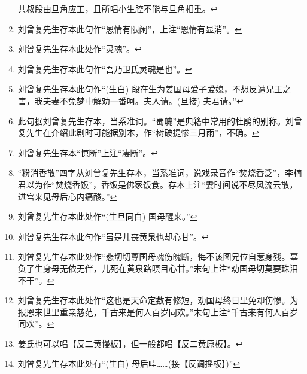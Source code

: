 \begin{enumerate}
  共叔段由旦角应工，且所唱小生腔不能与旦角相重。\protect\hyperlink{fnref14}{↩}
\item
  \leavevmode\hypertarget{fn15}{}%
  刘曾复先生存本此句作``恩情有限闲''，上注``恩情有显消''。\protect\hyperlink{fnref15}{↩}
\item
  \leavevmode\hypertarget{fn16}{}%
  刘曾复先生存本此处作``灵魂''。\protect\hyperlink{fnref16}{↩}
\item
  \leavevmode\hypertarget{fn17}{}%
  刘曾复先生存本此句作``吾乃卫氏灵魂是也''。\protect\hyperlink{fnref17}{↩}
\item
  \leavevmode\hypertarget{fn18}{}%
  刘曾复先生存本此句作``(生白)
  段在生为姜国母爱子爱媳，不想反遭兄王之害，我夫妻不免梦中解劝一番呵。夫人请。(旦接)
  夫君请。''\protect\hyperlink{fnref18}{↩}
\item
  \leavevmode\hypertarget{fn19}{}%
  此句据刘曾复先生存本，当系准词。``蜀魄''是典籍中常用的杜鹃的别称。刘曾复先生在介绍此剧时可能据别本，作``树破提惨三月雨''，不确。\protect\hyperlink{fnref19}{↩}
\item
  \leavevmode\hypertarget{fn20}{}%
  刘曾复先生存本``惊断''上注``凄断''。\protect\hyperlink{fnref20}{↩}
\item
  \leavevmode\hypertarget{fn21}{}%
  ``粉消香散''四字从刘曾复先生存本，当系准词，说戏录音作``焚烧香泛''，李楠君以为作``焚烧香饭''，香饭是佛家饭食。存本上注``霎时间说不尽风流云散，进宫来见母后心内痛酸。''\protect\hyperlink{fnref21}{↩}
\item
  \leavevmode\hypertarget{fn22}{}%
  刘曾复先生存本此处作``(生旦同白)
  国母醒来。''\protect\hyperlink{fnref22}{↩}
\item
  \leavevmode\hypertarget{fn23}{}%
  刘曾复先生存本此句作``虽是儿丧黄泉也却心甘''。\protect\hyperlink{fnref23}{↩}
\item
  \leavevmode\hypertarget{fn24}{}%
  刘曾复先生存本此处作``悲切切尊国母魂伤魄断，悔不该图兄位自惹身残。辜负了生身母无依无伴，儿死在黄泉路瞑目心甘。''末句上注``劝国母切莫要珠泪不干''。\protect\hyperlink{fnref24}{↩}
\item
  \leavevmode\hypertarget{fn25}{}%
  刘曾复先生存本此处作``这也是天命定数有修短，劝国母终日里免却伤惨。为报恩来世里重亲慈范，千古来是何人百岁同欢。''末句上注``千古来有何人百岁同欢''。\protect\hyperlink{fnref25}{↩}
\item
  \leavevmode\hypertarget{fn26}{}%
  姜氏也可以唱【反二黄慢板】，但一般都唱【反二黄原板】。\protect\hyperlink{fnref26}{↩}
\item
  \leavevmode\hypertarget{fn27}{}%
  刘曾复先生存本此处有``(生白)
  母后哇\ldots{}\ldots{}(接【反调摇板】)''\protect\hyperlink{fnref27}{↩}

\end{enumerate}
